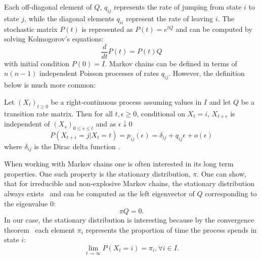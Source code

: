 Each off-diagonal element of $Q$, $q_{ij}$ represents the rate of jumping from state $i$ to state $j$,
while the diagonal elements $q_{ii}$ represent the rate of leaving $i$. The stochastic matrix
$P(t)$ is represented as $P(t) = e^{tQ}$ and can be computed by solving Kolmogorov's equations:
\begin{equation}
	\nonumber
	\frac{d}{dt}P(t) = P(t)Q
\end{equation}
with initial condition $P(0) = I$.
%
Markov chains can be defined in terms of $n(n-1)$ independent Poisson processes
of rates $q_{ij}$. However, the definition below is much more common:%
\begin{defn}
	\label{def:ctmc}
	Let $(X_t)_{t \ge 0}$ be a right-continuous process assuming values in $I$ and let $Q$
	be a transition rate matrix. Then for all $t, \epsilon \ge 0$, conditional on $X_t = i$,
	$X_{t+\epsilon}$ is independent of $(X_s)_{0 \le s \le t}$ and as $\epsilon \downarrow 0$
	\begin{equation}
		\nonumber
		P(X_{t+\epsilon} = j | X_t = t) = p_{ij}(\epsilon) = \delta_{ij} + q_{ij}\epsilon + o(\epsilon)
	\end{equation}
	where $\delta_{ij}$ is the Dirac delta function \cite{norris1998markov}.
\end{defn}
When working with Markov
chains one is often interested in its long term properties. One such property is the
stationary distribution, $\pi$. One can show, that for irreducible and non-explosive Markov chains,
the stationary distribution always exists~\cite{norris1998markov} and can be computed as the left eigenvector of $Q$ 
corresponding to the eigenvalue $0$:
\begin{equation}
	\nonumber
	\pi Q = 0.
\end{equation}
In our case, the stationary distribution is interesting because by the convergence theorem~\cite{aldous-fill-2014}
each element $\pi_i$ represents the proportion of time the process spends in state $i$:
\begin{equation}
	\nonumber
	\lim\limits_{t \rightarrow \infty} P(X_t = i) = \pi_i, \forall i \in I.
\end{equation}

